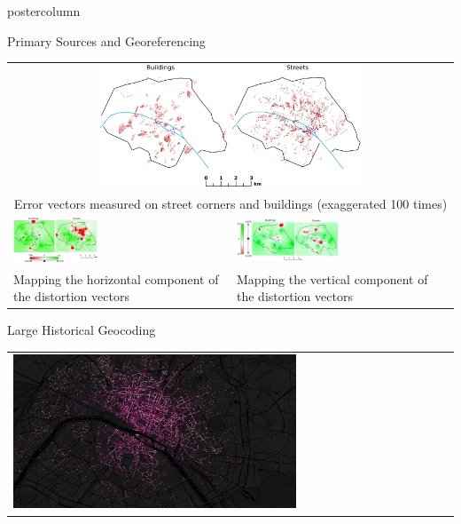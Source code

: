 \documentclass[final,hyperref={pdfpagelabels=false}]{beamer}
\begin{document}
\begin{frame}
\begin{columns}
\begin{column}{0.5\textwidth}
\begin{beamercolorbox}[center,wd=\textwidth]{postercolumn}
\begin{minipage}[t]{.98\textwidth}
\begin{block}{Primary Sources and Georeferencing}
\begin{tabular}{p{}p{}}
        \multicolumn{2}{c}{\includegraphics[width=0.6\textwidth]{figures/errorthemes.png}}\\
	\multicolumn{2}{c}{\scriptsize Error vectors measured on street corners and buildings (exaggerated 100 times)}\\
        \vspace{0pt}
        \includegraphics[width=0.4\textwidth]{figures/error_x.png}&
        \vspace{0pt}
        \hspace*{-1em}\includegraphics[width=0.48\textwidth]{figures/error_y.png}\\
	\scriptsize Mapping the horizontal component of the distortion vectors&
        \scriptsize Mapping the vertical component of the distortion vectors
      \end{tabular}
    \end{block}
    \begin{block}{Large Historical Geocoding}
      \begin{tabular}{>{\centering}m{}}
        \includegraphics[width=0.65\textwidth]{figures/geocoding}\\

\end{tabular}
\end{block}
\end{minipage}
\end{beamercolorbox}
\end{column}
\end{columns}
\end{frame}
\end{document}

